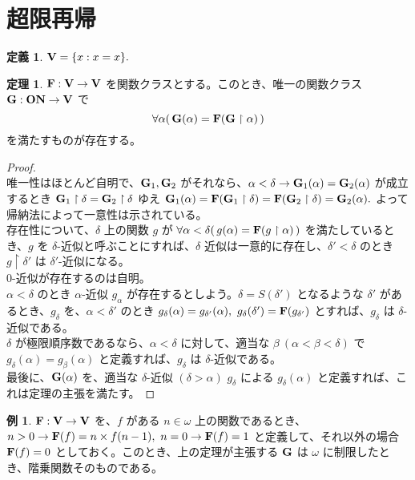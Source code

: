 \documentclass{jsarticle}
\theoremstyle{definition}
\newtheorem*{definition*}{定義}
\newtheorem{theorem}{定理}[section]
\newtheorem{example}{例}[section]
\begin{document}
    \section{超限再帰}
    \begin{definition*} \label{transfinite_recursion}
        ${\bf V} = \{ x : x = x \}.$
    \end{definition*}
    \begin{theorem}
        ${\bf F} : {\bf V} \rightarrow {\bf V}$ を関数クラスとする。このとき、唯一の関数クラス ${\bf G} : \bf{ON} \rightarrow {\bf V}$ で \\
        $$\forall \alpha(\,{\bf G}(\alpha) ={\bf F}({\bf G}\restriction\alpha)\,)$$
        を満たすものが存在する。
    \end{theorem}
    \begin{proof} \ \\
        唯一性はほとんど自明で、${\bf G}_1, {\bf G}_2$ がそれなら、$\alpha < \delta \rightarrow {\bf G}_1(\alpha) = {\bf G}_2(\alpha)$ が成立するとき ${\bf G}_1\restriction\delta = {\bf G}_2\restriction\delta$ ゆえ ${\bf G}_1(\alpha) = {\bf F}({\bf G}_1\restriction\delta) = {\bf F}({\bf G}_2\restriction\delta) = {\bf G}_2(\alpha).$ よって帰納法によって一意性は示されている。\\
        存在性について、$\delta$ 上の関数 $g$ が $\forall \alpha < \delta(\,g(\alpha) ={\bf F}(g\restriction\alpha)\,)$ を満たしているとき、$g$ を $\delta$-近似と呼ぶことにすれば、$\delta$ 近似は一意的に存在し、$\delta' < \delta$ のとき $g\restriction\delta'$ は $\delta'$-近似になる。\\
        $0$-近似が存在するのは自明。\\
        $\alpha < \delta$ のとき $\alpha$-近似 $g_\alpha$ が存在するとしよう。$\delta = S(\delta')$ となるような $\delta'$ があるとき、$g_\delta$ を、$\alpha < \delta'$ のとき $g_\delta(\alpha) = g_{\delta'}(\alpha), \ g_\delta(\delta') = {\bf F}(g_{\delta'})$ とすれば、$g_\delta$ は $\delta$-近似である。\\
        $\delta$ が極限順序数であるなら、$\alpha < \delta$ に対して、適当な $\beta \ (\alpha < \beta < \delta)$ で $g_\delta(\alpha) = g_\beta(\alpha)$ と定義すれば、$g_\delta$ は $\delta$-近似である。\\
        最後に、${\bf G}(\alpha)$ を、適当な $\delta$-近似 $(\delta > \alpha)$ $g_\delta$ による $g_\delta(\alpha)$ と定義すれば、これは定理の主張を満たす。
    \end{proof}
    
    \begin{example}
        ${\bf F} : {\bf V} \rightarrow {\bf V}$ を、$f$ がある $n \in \omega$ 上の関数であるとき、$n > 0 \rightarrow {\bf F}(f) = n \times f(n-1), \ n = 0 \rightarrow {\bf F}(f) = 1$ と定義して、それ以外の場合 ${\bf F}(f) = 0$ としておく。このとき、上の定理が主張する ${\bf G}$ は $\omega$ に制限したとき、階乗関数そのものである。
    \end{example}
    
\end{document}
